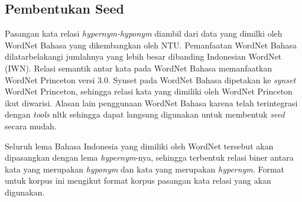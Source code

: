 \subsection{Pembentukan Seed}
Pasangan kata relasi \textit{hypernym-hyponym} diambil dari data yang dimilki oleh WordNet Bahasa yang dikembangkan oleh NTU. Pemanfaatan WordNet Bahasa dilatarbelakangi jumlahnya yang lebih besar dibanding Indonesian WordNet (IWN). Relasi semantik antar kata pada WordNet Bahasa memanfaatkan WordNet Princeton versi 3.0. Synset pada WordNet Bahasa dipetakan ke \textit{synset} WordNet Princeton, sehingga relasi kata yang dimiliki oleh WordNet Princeton ikut diwarisi. Alasan lain penggunaan WordNet Bahasa karena telah terintegrasi dengan \textit{tools} nltk sehingga dapat langsung digunakan untuk membentuk \textit{seed} secara mudah.

Seluruh lema Bahasa Indonesia yang dimiliki oleh WordNet tersebut akan dipasangkan dengan lema \textit{hypernym}-nya, sehingga terbentuk relasi biner antara kata yang merupakan \textit{hyponym} dan kata yang merupakan \textit{hypernym}. Format untuk korpus ini mengikut format korpus pasangan kata relasi yang akan digunakan.
